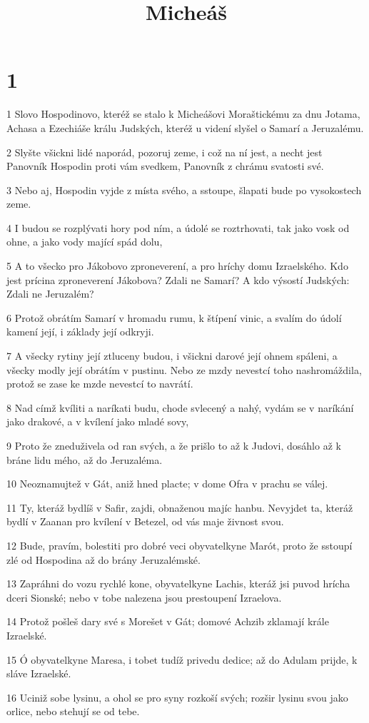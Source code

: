 

\title{Micheáš}

\chapter{1}

\par 1 Slovo Hospodinovo, kteréž se stalo k Micheášovi Moraštickému za dnu Jotama, Achasa a Ezechiáše králu Judských, kteréž u videní slyšel o Samarí a Jeruzalému.
\par 2 Slyšte všickni lidé naporád, pozoruj zeme, i což na ní jest, a necht jest Panovník Hospodin proti vám svedkem, Panovník z chrámu svatosti své.
\par 3 Nebo aj, Hospodin vyjde z místa svého, a sstoupe, šlapati bude po vysokostech zeme.
\par 4 I budou se rozplývati hory pod ním, a údolé se roztrhovati, tak jako vosk od ohne, a jako vody mající spád dolu,
\par 5 A to všecko pro Jákobovo zproneverení, a pro hríchy domu Izraelského. Kdo jest prícina zproneverení Jákobova? Zdali ne Samarí? A kdo výsostí Judských: Zdali ne Jeruzalém?
\par 6 Protož obrátím Samarí v hromadu rumu, k štípení vinic, a svalím do údolí kamení její, i základy její odkryji.
\par 7 A všecky rytiny její ztluceny budou, i všickni darové její ohnem spáleni, a všecky modly její obrátím v pustinu. Nebo ze mzdy nevestcí toho nashromáždila, protož se zase ke mzde nevestcí to navrátí.
\par 8 Nad címž kvíliti a naríkati budu, chode svlecený a nahý, vydám se v naríkání jako drakové, a v kvílení jako mladé sovy,
\par 9 Proto že zneduživela od ran svých, a že prišlo to až k Judovi, dosáhlo až k bráne lidu mého, až do Jeruzaléma.
\par 10 Neoznamujtež v Gát, aniž hned placte; v dome Ofra v prachu se válej.
\par 11 Ty, kteráž bydlíš v Safir, zajdi, obnaženou majíc hanbu. Nevyjdet ta, kteráž bydlí v Zaanan pro kvílení v Betezel, od vás maje živnost svou.
\par 12 Bude, pravím, bolestiti pro dobré veci obyvatelkyne Marót, proto že sstoupí zlé od Hospodina až do brány Jeruzalémské.
\par 13 Zapráhni do vozu rychlé kone, obyvatelkyne Lachis, kteráž jsi puvod hrícha dceri Sionské; nebo v tobe nalezena jsou prestoupení Izraelova.
\par 14 Protož pošleš dary své s Morešet v Gát; domové Achzib zklamají krále Izraelské.
\par 15 Ó obyvatelkyne Maresa, i tobet tudíž privedu dedice; až do Adulam prijde, k sláve Izraelské.
\par 16 Uciniž sobe lysinu, a ohol se pro syny rozkoší svých; rozšir lysinu svou jako orlice, nebo stehují se od tebe.

